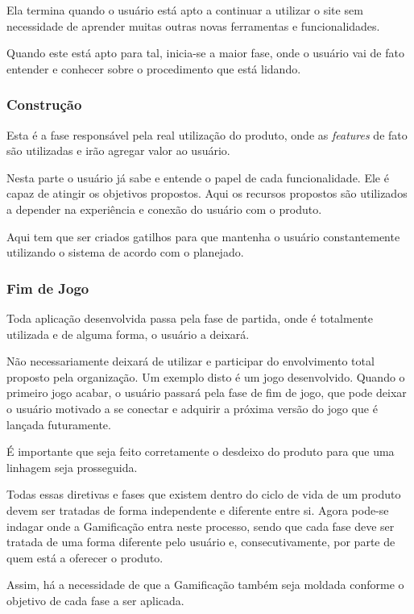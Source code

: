 Ela termina quando o usuário está apto a continuar a utilizar o site sem
necessidade de aprender muitas outras novas ferramentas e funcionalidades.

Quando este está apto para tal, inicia-se a maior fase, onde o usuário
vai de fato entender e conhecer sobre o procedimento que está lidando.

\subsubsection{Construção}
\label{sub:constru_o}
Esta é a fase responsável pela real utilização do produto, onde as \textit{features}
de fato são utilizadas e irão agregar valor ao usuário.

Nesta parte o usuário já sabe e entende o papel de cada funcionalidade. Ele é capaz
de atingir os objetivos propostos. Aqui os recursos propostos são utilizados
a depender na experiência e conexão do usuário com o produto.

Aqui tem que ser criados gatilhos para que mantenha o usuário constantemente utilizando
o sistema de acordo com o planejado.

\subsubsection{Fim de Jogo}
\label{sub:fim_de_jogo}
Toda aplicação desenvolvida passa pela fase de partida, onde é totalmente utilizada
e de alguma forma, o usuário a deixará.

Não necessariamente deixará de utilizar e participar do envolvimento total proposto pela
organização. Um exemplo disto é um jogo desenvolvido. Quando o primeiro jogo acabar, o
usuário passará pela fase de fim de jogo, que pode deixar o usuário motivado a se conectar
e adquirir a próxima versão do jogo que é lançada futuramente.

É importante que seja feito corretamente o desdeixo do produto para que uma linhagem seja
prosseguida.


Todas essas diretivas e fases que existem dentro do ciclo de vida de um produto
devem ser
tratadas de forma independente e diferente entre si. Agora pode-se indagar onde
a Gamificação
entra neste processo, sendo que cada fase deve ser tratada de uma forma diferente pelo
usuário e, consecutivamente, por parte de quem está a oferecer o produto.

Assim, há a necessidade de que a Gamificação também seja moldada conforme o objetivo de
cada fase a ser aplicada.

